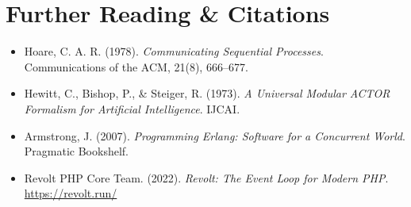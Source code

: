 \section{Further Reading \& Citations}

\begin{itemize}[leftmargin=15pt]
  \item Hoare, C. A. R. (1978). \textit{Communicating Sequential Processes}. Communications of the ACM, 21(8), 666--677.
  \item Hewitt, C., Bishop, P., \& Steiger, R. (1973). \textit{A Universal Modular ACTOR Formalism for Artificial Intelligence}. IJCAI.
  \item Armstrong, J. (2007). \textit{Programming Erlang: Software for a Concurrent World}. Pragmatic Bookshelf.
  \item Revolt PHP Core Team. (2022). \textit{Revolt: The Event Loop for Modern PHP}. \url{https://revolt.run/}
\end{itemize}
